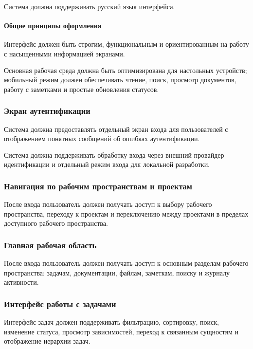 Система должна поддерживать русский язык интерфейса.

\paragraph{Общие принципы оформления}

Интерфейс должен быть строгим, функциональным и ориентированным на работу с насыщенными информацией экранами.

Основная рабочая среда должна быть оптимизирована для настольных устройств; мобильный режим должен обеспечивать чтение, поиск, просмотр документов, работу с заметками и простые обновления статусов.

\subsubsection{Экран аутентификации}

Система должна предоставлять отдельный экран входа для пользователей с отображением понятных сообщений об ошибках аутентификации.

Система должна поддерживать обработку входа через внешний провайдер идентификации и отдельный режим входа для локальной разработки.

\subsubsection{Навигация по рабочим пространствам и проектам}

После входа пользователь должен получать доступ к выбору рабочего пространства, переходу к проектам и переключению между проектами в пределах доступного рабочего пространства.

\subsubsection{Главная рабочая область}

После входа пользователь должен получать доступ к основным разделам рабочего пространства: задачам, документации, файлам, заметкам, поиску и журналу активности.

\subsubsection{Интерфейс работы с задачами}

Интерфейс задач должен поддерживать фильтрацию, сортировку, поиск, изменение статуса, просмотр зависимостей, переход к связанным сущностям и отображение иерархии задач.

